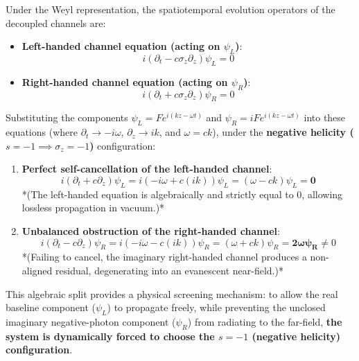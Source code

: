 \documentclass[12pt, a4paper]{article}
\begin{document}
Under the Weyl representation, the spatiotemporal evolution operators of the decoupled channels are:
\begin{itemize}
    \item \textbf{Left-handed channel equation (acting on $\psi_L$)}:
    \begin{equation}
    i(\partial_t - c \sigma_z \partial_z)\psi_L = 0 \label{eq:weyl_l}
    \end{equation}
    
    \item \textbf{Right-handed channel equation (acting on $\psi_R$)}:
    \begin{equation}
    i(\partial_t + c \sigma_z \partial_z)\psi_R = 0 \label{eq:weyl_r}
    \end{equation}
\end{itemize}

Substituting the components $\psi_L = F e^{i(kz-\omega t)}$ and $\psi_R = i F e^{i(kz-\omega t)}$ into these equations (where $\partial_t \to -i\omega$, $\partial_z \to ik$, and $\omega = ck$), under the \textbf{negative helicity ($s = -1 \implies \sigma_z = -1$)} configuration:
\begin{enumerate}
    \item \textbf{Perfect self-cancellation of the left-handed channel}:
    \begin{equation}
    i(\partial_t + c\partial_z)\psi_L = i(-i\omega + c(ik)) \psi_L = (\omega - ck)\psi_L = \mathbf{0} \label{eq:cancel_l}
    \end{equation}
    *(The left-handed equation is algebraically and strictly equal to $0$, allowing lossless propagation in vacuum.)*
    
    \item \textbf{Unbalanced obstruction of the right-handed channel}:
    \begin{equation}
    i(\partial_t - c\partial_z)\psi_R = i(-i\omega - c(ik)) \psi_R = (\omega + ck)\psi_R = \mathbf{2\omega \psi_R} \neq 0 \label{eq:non_cancel_r}
    \end{equation}
    *(Failing to cancel, the imaginary right-handed channel produces a non-aligned residual, degenerating into an evanescent near-field.)*
\end{enumerate}

This algebraic split provides a physical screening mechanism: to allow the real baseline component ($\psi_L$) to propagate freely, while preventing the unclosed imaginary negative-photon component ($\psi_R$) from radiating to the far-field, \textbf{the system is dynamically forced to choose the $s = -1$ (negative helicity) configuration}.
\end{document}
